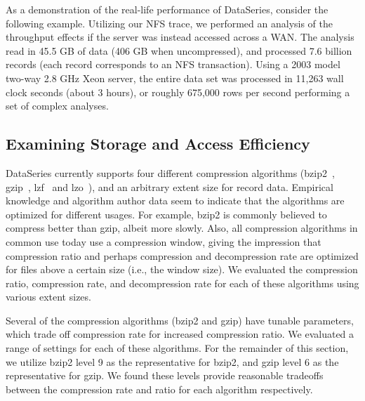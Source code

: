 \documentclass{acm_proc_article-sp}
\begin{document}
As a demonstration of the real-life performance of
DataSeries, consider the following example.  Utilizing our NFS
trace, we performed an analysis of the throughput
effects if the server was instead accessed across a WAN.
The analysis read in 45.5 GB of data (406 GB when uncompressed), and
processed 7.6 billion records (each record corresponds to an NFS
transaction).  Using a 2003 model two-way 2.8 GHz Xeon server, the
entire data set was processed in 11,263 wall clock seconds (about 3
hours), or roughly 675,000 rows per second performing a set of complex
analyses.



\subsection{Examining Storage and Access Efficiency}\label{sec:efficiency}


DataSeries currently supports four different compression algorithms
(bzip2~\cite{BZIP}, gzip~\cite{GZIP}, lzf~\cite{LZF} and lzo~\cite{LZO}),
and an arbitrary extent size for record data.  Empirical knowledge and
algorithm author data seem to indicate that the algorithms are
optimized for different usages.  For example, bzip2 is commonly
believed to compress better than gzip, albeit more slowly.  Also,
all compression algorithms in common use today use a compression
window, giving the impression that compression ratio and perhaps
compression and decompression rate are optimized for files above a
certain size (i.e., the window size).  
We evaluated the compression ratio, compression rate, 
and decompression rate for each of these algorithms
using various extent sizes.

Several of the compression algorithms (bzip2 and gzip)
have tunable parameters, which trade 
off compression rate for increased compression ratio.
We evaluated a range of settings for each of these algorithms.  
For the remainder of this section, we utilize bzip2 level 9 as
the representative for bzip2, and gzip level 6 as the representative
for gzip.  We found these levels provide reasonable tradeoffs
between the compression rate and ratio for each algorithm respectively.
\end{document}
